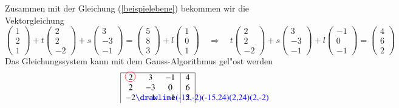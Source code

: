 \begin{beispiel}
{\parindent0pt Zusammen} mit der Gleichung (\ref{beispielebene}) bekommen wir die 
Vektorgleichung
\[
\begin{pmatrix}1\\2\\1 \end{pmatrix}
+
t\begin{pmatrix}2\\2\\-2\end{pmatrix}
+
s\begin{pmatrix}3\\-3\\-1\end{pmatrix}
=
\begin{pmatrix} 5\\8\\3 \end{pmatrix}
+
l\begin{pmatrix} 1\\0\\1 \end{pmatrix}
\quad\Rightarrow\quad
t\begin{pmatrix}2\\2\\-2\end{pmatrix}
+
s\begin{pmatrix}3\\-3\\-1\end{pmatrix}
+
l\begin{pmatrix} -1\\0\\-1 \end{pmatrix}
=
\begin{pmatrix} 4\\6\\2 \end{pmatrix}
\]
Das Gleichungssystem kann mit dem Gauss-Algorithmus
gel"ost werden
\begin{align*}
\begin{tabular}{|>{$}c<{$}>{$}c<{$}>{$}c<{$}|>{$}c<{$}|}
\hline
 2%
\begin{picture}(0,0)
\color{red}\put(-3,4){\circle{12}}
\end{picture}%
& 3&-1&4\\
 2&-3& 0&6\\
-2%
\begin{picture}(0,0)
\color{blue}\drawline(-15,-2)(-15,24)(2,24)(2,-2)
\end{picture}
&-1&-1&2\\

\end{tabular}
\end{align*}
\end{beispiel}
